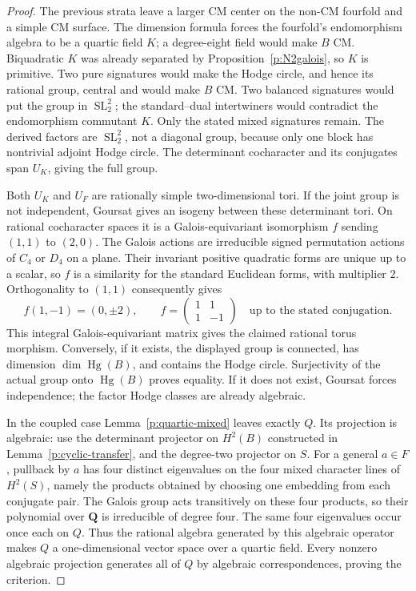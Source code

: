 \documentclass[11pt,reqno]{article}
\theoremstyle{emphasizedplain}
\theoremstyle{emphasizeddefinition}
\theoremstyle{emphasizeddefinition}
\DeclareMathOperator{\Hg}{Hg}
\DeclareMathOperator{\SL}{SL}
\newcommand{\Q}{\mathbf Q}
\begin{document}
\begin{proof}
The previous strata leave a larger CM center on the non-CM
fourfold and a simple CM surface. The dimension formula forces
the fourfold's endomorphism algebra to be a quartic field $K$;
a degree-eight field would make $B$ CM. Biquadratic $K$ was
already separated by Proposition~\ref{p:N2galois}, so $K$ is
primitive. Two pure signatures would make the Hodge circle,
and hence its rational group, central and would make $B$ CM.
Two balanced signatures would put the group in $\SL_2^2$;
the standard--dual intertwiners would contradict the endomorphism
commutant $K$. Only the stated mixed signatures remain. The
derived factors are $\SL_2^2$, not a diagonal group, because
only one block has nontrivial adjoint Hodge circle. The determinant
cocharacter and its conjugates span $U_K$, giving the full group.

Both $U_K$ and $U_F$ are rationally simple two-dimensional tori.
If the joint group is not independent, Goursat gives an isogeny
between these determinant tori. On rational cocharacter spaces
it is a Galois-equivariant isomorphism $f$ sending $(1,1)$ to
$(2,0)$. The Galois actions are irreducible signed permutation
actions of $C_4$ or $D_4$ on a plane. Their invariant positive
quadratic forms are unique up to a scalar, so $f$ is a similarity
for the standard Euclidean forms, with multiplier $2$.
Orthogonality to $(1,1)$ consequently gives
\[
 f(1,-1)=(0,\pm2),\qquad
 f=\begin{pmatrix}1&1\\1&-1\end{pmatrix}
 \quad\text{up to the stated conjugation}.
\]
This integral Galois-equivariant matrix gives the claimed rational
torus morphism. Conversely, if it exists, the displayed group is
connected, has dimension $\dim\Hg(B)$, and contains the Hodge
circle. Surjectivity of the actual group onto $\Hg(B)$ proves
equality. If it does not exist, Goursat forces independence;
the factor Hodge classes are already algebraic.

In the coupled case Lemma~\ref{p:quartic-mixed} leaves exactly
$Q$. Its projection is algebraic: use the determinant projector
on $H^2(B)$ constructed in Lemma~\ref{p:cyclic-transfer},
and the degree-two projector on $S$. For a general
$a\in F$, pullback by $a$ has four distinct eigenvalues on the
four mixed character lines of $H^2(S)$, namely the products
obtained by choosing one embedding from each conjugate pair.
The Galois group acts transitively on these four products, so
their polynomial over $\Q$ is irreducible of degree four.
The same four eigenvalues occur once each on $Q$.
Thus the rational algebra generated by this algebraic operator
makes $Q$ a one-dimensional vector space over a quartic field.
Every nonzero algebraic projection generates all of $Q$ by
algebraic correspondences, proving the criterion.
\end{proof}
\end{document}
